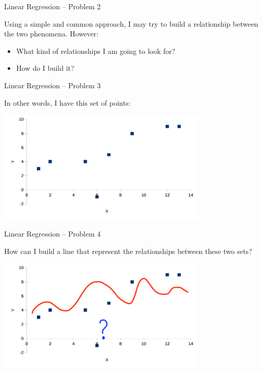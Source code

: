 \documentclass{beamer}
\begin{document}
\begin{frame}
{\centerline{Linear Regression -- Problem 2}}
Using a simple and common approach, I may try to build a relationship between the two phenomena.
However:
\begin{itemize}
\item  What kind of relationships I am going to look for?
\item How do I build it?
\end{itemize}

\end{frame}

\begin{frame}
{\centerline{Linear Regression -- Problem 3}}

In other words, I have this set of points:

\begin{center}
\includegraphics[width=10cm]{A2022.IDSEPC.RegressioneLineare/LinearRegression_Points.png}
\end{center}

\end{frame}

\begin{frame}
{\centerline{Linear Regression -- Problem 4}}

How can I build a line that represent the relationships between these two sets?

\begin{center}
\includegraphics[width=10cm]{A2022.IDSEPC.RegressioneLineare/LinearRegression_Lines.png}
\end{center}



\end{frame}
\end{document}
